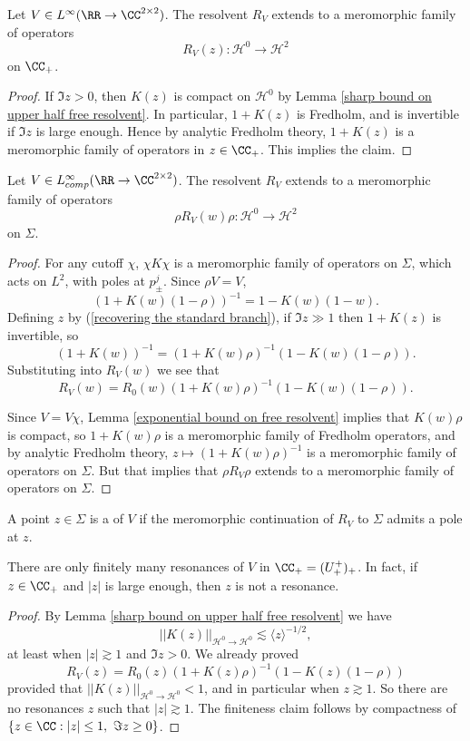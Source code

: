 \begin{theorem}
Let $V \in L^\infty(\RR \to \CC^{2 \times 2})$.
The resolvent $R_V$ extends to a meromorphic family of operators
$$R_V(z): \mathcal H^0 \to \mathcal H^2$$
on $\CC_+$.
\end{theorem}
\begin{proof}
If $\Im z > 0$, then $K(z)$ is compact on $\mathcal H^0$ by Lemma \ref{sharp bound on upper half free resolvent}. In particular, $1 + K(z)$ is Fredholm, and is invertible if $\Im z$ is large enough.
Hence by analytic Fredholm theory, $1 + K(z)$ is a meromorphic family of operators in $z \in \CC_+$. This implies the claim.
\end{proof}

\begin{theorem}
Let $V \in L^\infty_{comp}(\RR \to \CC^{2 \times 2})$.
The resolvent $R_V$ extends to a meromorphic family of operators
$$\rho R_V(w) \rho: \mathcal H^0 \to \mathcal H^2$$
on $\Sigma$.
\end{theorem}
\begin{proof}
For any cutoff $\chi$, $\chi K \chi$ is a meromorphic family of operators on $\Sigma$, which acts on $L^2$, with poles at $p_\pm^j$.
Since $\rho V = V$,
$$(1 + K(w)(1-\rho))^{-1} = 1 - K(w)(1 - w).$$
Defining $z$ by (\ref{recovering the standard branch}), if $\Im z \gg 1$ then $1 + K(z)$ is invertible, so
$$(1 + K(w))^{-1} = (1 + K(w)\rho)^{-1}(1 - K(w)(1 - \rho)).$$
Substituting into $R_V(w)$ we see that
$$R_V(w) = R_0(w)(1 + K(w)\rho)^{-1}(1 - K(w)(1 - \rho)).$$

Since $V = V\chi$, Lemma \ref{exponential bound on free resolvent} implies that $K(w)\rho$ is compact, so $1 + K(w)\rho$ is a meromorphic family of Fredholm operators, and by analytic Fredholm theory, $z \mapsto (1 + K(w)\rho)^{-1}$ is a meromorphic family of operators on $\Sigma$.
But that implies that $\rho R_V \rho$ extends to a meromorphic family of operators on $\Sigma$.
\end{proof}

\begin{definition}
A point $z \in \Sigma$ is a  of $V$ if the meromorphic continuation of $R_V$ to $\Sigma$ admits a pole at $z$.
\end{definition}

\begin{corollary}
There are only finitely many resonances of $V$ in $\CC_+ = (U_+^+)_+$. In fact, if $z \in \CC_+$ and $|z|$ is large enough, then $z$ is not a resonance.
\end{corollary}
\begin{proof}
By Lemma \ref{sharp bound on upper half free resolvent} we have
$$||K(z)||_{\mathcal H^0 \to \mathcal H^0} \lesssim \langle z \rangle^{-1/2},$$
at least when $|z| \gtrsim 1$ and $\Im z > 0$.
We already proved
$$R_V(z) = R_0(z)(1 + K(z)\rho)^{-1}(1 - K(z)(1 - \rho))$$
provided that $||K(z)||_{\mathcal H^0 \to \mathcal H^0} < 1$, and in particular when $z \gtrsim 1$. So there are no resonances $z$ such that $|z| \gtrsim 1$. The finiteness claim follows by compactness of $\{z \in \CC: |z| \leq 1, ~\Im z \geq 0\}$.
\end{proof}


